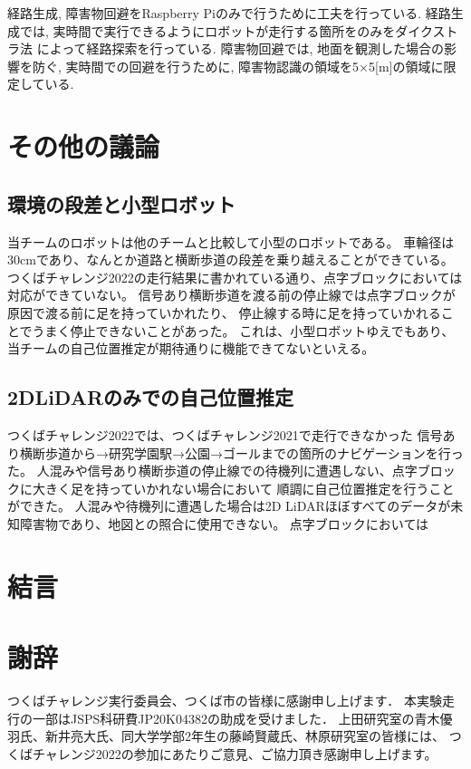 \documentclass[twocolumn,9pt]{jsproceedings}
\begin{document}
経路生成, 障害物回避をRaspberry Piのみで行うために工夫を行っている. 
経路生成では, 実時間で実行できるようにロボットが走行する箇所をのみをダイクストラ法
によって経路探索を行っている. 障害物回避では, 地面を観測した場合の影響を防ぐ, 実時間での回避を行うために, 
障害物認識の領域を5×5[m]の領域に限定している. 

\section{その他の議論}

\subsection{環境の段差と小型ロボット}

当チームのロボットは他のチームと比較して小型のロボットである。
車輪径は30cmであり、なんとか道路と横断歩道の段差を乗り越えることができている。
つくばチャレンジ2022の走行結果に書かれている通り、点字ブロックにおいては対応ができていない。
信号あり横断歩道を渡る前の停止線では点字ブロックが原因で渡る前に足を持っていかれたり、
停止線する時に足を持っていかれることでうまく停止できないことがあった。
これは、小型ロボットゆえでもあり、当チームの自己位置推定が期待通りに機能できてないといえる。

\subsection{2DLiDARのみでの自己位置推定}

つくばチャレンジ2022では、つくばチャレンジ2021で走行できなかった
信号あり横断歩道から→研究学園駅→公園→ゴールまでの箇所のナビゲーションを行った。
人混みや信号あり横断歩道の停止線での待機列に遭遇しない、点字ブロックに大きく足を持っていかれない場合において
順調に自己位置推定を行うことができた。
人混みや待機列に遭遇した場合は2D LiDARほぼすべてのデータが未知障害物であり、地図との照合に使用できない。
点字ブロックにおいては

\section{結言}

\section*{謝辞}

つくばチャレンジ実行委員会、つくば市の皆様に感謝申し上げます．
本実験走行の一部はJSPS科研費JP20K04382の助成を受けました．
上田研究室の青木優羽氏、新井亮大氏、同大学学部2年生の藤崎賢蔵氏、林原研究室の皆様には、
つくばチャレンジ2022の参加にあたりご意見、ご協力頂き感謝申し上げます。
\end{document}
